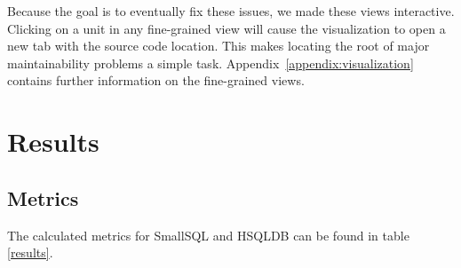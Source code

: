\documentclass{article}
\begin{document}
Because the goal is to eventually fix these issues, we made these views interactive.
Clicking on a unit in any fine-grained view will cause the visualization to open a new tab with the source code location.
This makes locating the root of major maintainability problems a simple task.
Appendix~\ref{appendix:visualization} contains further information on the fine-grained views.

\section{Results}

\subsection{Metrics}
The calculated metrics for SmallSQL and HSQLDB can be found in table \ref{results}.
\end{document}
